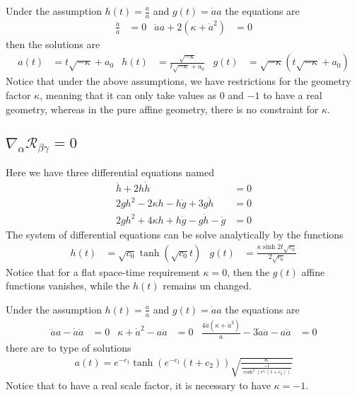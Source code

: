 \documentclass[10pt,a4paper]{article}
\begin{document}
Under the assumption $h(t) = \frac{\dot{a}}{a}$ and $g(t) = \dot{a}a$ the equations are
\begin{align}
  \frac{\ddot{a}}{a} & = 0 & \ddot{a}a + 2\left(\kappa + \dot{a}^2\right) & = 0
\end{align}
then the solutions are
\begin{align}
  a(t) & = t\sqrt{-\kappa} + a_0 & h(t) & = \frac{\sqrt{-\kappa}}{t\sqrt{-\kappa} + a_0} & g(t) & = \sqrt{-\kappa}\left(t\sqrt{-\kappa} + a_0\right)
\end{align}
Notice that under the above assumptions, we have restrictions for the geometry factor $\kappa$, meaning that it can only take
values as $0$ and $-1$ to have a real geometry, whereas in the pure affine geometry, there is no constraint for $\kappa$.


\subsection{$\nabla_{\alpha}\mathcal{R}_{\beta\gamma}  = 0$}

Here we have three differential equations named
\begin{align}
  \ddot{h} + 2h\dot{h} & = 0 \\
  2gh^2 - 2\kappa h - h\dot{g} + 3g\dot{h} & = 0 \\
  2gh^2 + 4\kappa h + h\dot{g} - g\dot{h} - \ddot{g} & = 0
\end{align}
The system of differential equations can be solve analytically by the functions
\begin{align}
  h(t) & = \sqrt{c_0}\tanh\left(\sqrt{c_0}t\right) & g(t) & = \frac{\kappa \sinh{2t\sqrt{c_0}}}{2\sqrt{c_0}} 
\end{align}
Notice that for a flat space-time requirement $\kappa = 0$, then the $g(t)$ affine functions vanishes, while the $h(t)$ remains un changed.

Under the assumption $h(t) = \frac{\dot{a}}{a}$ and $g(t) = \dot{a}a$ the equations are
\begin{align}
  \dddot{a}a - \dot{a}\ddot{a} & = 0 & \kappa + \dot{a}^2 - a\ddot{a} & = 0 & \frac{4\dot{a}\left(\kappa + \dot{a}^2\right)}{a} - 3\dot{a}\ddot{a} - a\dddot{a} & = 0
\end{align}
there are to type of solutions
\begin{align}
  a(t) = e^{-c_1} \tanh\left(e^{-c_1} \left(t + c_2\right)\right)\sqrt{\frac{\kappa}{\frac{-1}{\cosh^2\left({e^{c_1}\left(t + c_2\right)}\right)}}}
\end{align}
Notice that to have a real scale factor, it is necessary to have $\kappa = -1$.
\end{document}

